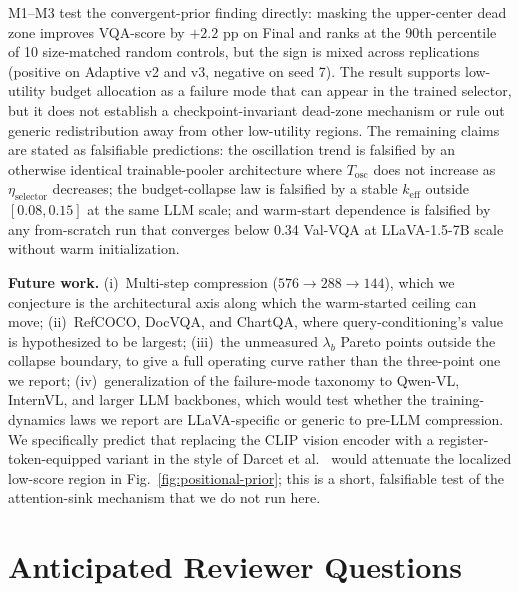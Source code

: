 \documentclass{article}
\begin{document}
M1--M3 test the convergent-prior finding directly: masking the upper-center
dead zone improves VQA-score by $+2.2$ pp on Final and ranks at the 90th
percentile of 10 size-matched random controls, but the sign is mixed across
replications (positive on Adaptive v2 and v3, negative on seed 7). The result
supports low-utility budget allocation as a failure mode that can appear in the
trained selector, but it does not establish a checkpoint-invariant dead-zone
mechanism or rule out generic redistribution away from other low-utility
regions. The remaining claims are stated as falsifiable predictions: the
oscillation trend is
falsified by an otherwise identical trainable-pooler architecture where
$T_\text{osc}$ does not increase as $\eta_\text{selector}$ decreases; the
budget-collapse law is falsified by a stable $k_\text{eff}$ outside
$[0.08, 0.15]$ at the same LLM scale; and warm-start dependence is falsified
by any from-scratch run that converges below 0.34 Val-VQA at LLaVA-1.5-7B
scale without warm initialization.

\textbf{Future work.}
(i)~Multi-step compression ($576 \to 288 \to 144$), which we
conjecture is the architectural axis along which the warm-started
ceiling can move; (ii)~RefCOCO, DocVQA, and ChartQA, where
query-conditioning's value is hypothesized to be largest; (iii)~the
unmeasured $\lambda_b$ Pareto points outside the collapse boundary,
to give a full operating curve rather than the three-point one we
report; (iv)~generalization of the failure-mode taxonomy to Qwen-VL,
InternVL, and larger LLM backbones, which would test whether the
training-dynamics laws we report are LLaVA-specific or generic to
pre-LLM compression. We specifically predict that replacing the CLIP
vision encoder with a register-token-equipped variant in the style of
Darcet et al.~\cite{darcet2024vision} would attenuate the localized
low-score region in Fig.~\ref{fig:positional-prior}; this is a short,
falsifiable test of the attention-sink mechanism that we do not run here.




\appendix

\section{Anticipated Reviewer Questions}
\label{sec:anticipated}
\end{document}
